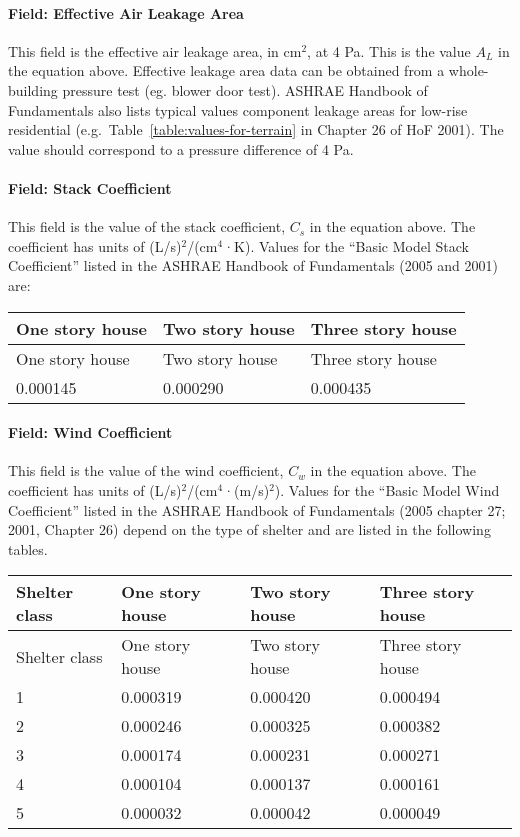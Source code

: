 \paragraph{Field: Effective Air Leakage Area}\label{field-effective-air-leakage-area}

This field is the effective air leakage area, in cm\(^{2}\), at 4 Pa. This is the value \({A_L}\) in the equation above. Effective leakage area data can be obtained from a whole-building pressure test (eg. blower door test). ASHRAE Handbook of Fundamentals also lists typical values component leakage areas for low-rise residential (e.g.~Table~\ref{table:values-for-terrain} in Chapter 26 of HoF 2001). The value should correspond to a pressure difference of 4 Pa.

\paragraph{Field: Stack Coefficient}\label{field-stack-coefficient}

This field is the value of the stack coefficient, \({C_s}\) in the equation above. The coefficient has units of (L/s)\(^{2}\)/(cm\(^{4}\)·K). Values for the ``Basic Model Stack Coefficient'' listed in the ASHRAE Handbook of Fundamentals (2005 and 2001) are:

\begin{longtable}[c]{@{}lll@{}}
\toprule
One story house & Two story house & Three story house \tabularnewline
\midrule
\endfirsthead

\toprule
One story house & Two story house & Three story house \tabularnewline
\midrule
\endhead

0.000145 & 0.000290 & 0.000435 \tabularnewline
\bottomrule
\end{longtable}

\paragraph{Field: Wind Coefficient}\label{field-wind-coefficient}

This field is the value of the wind coefficient, \({C_w}\) in the equation above. The coefficient has units of (L/s)\(^{2}\)/(cm\(^{4}\)·(m/s)\(^{2}\)). Values for the ``Basic Model Wind Coefficient'' listed in the ASHRAE Handbook of Fundamentals (2005 chapter 27; 2001, Chapter 26) depend on the type of shelter and are listed in the following tables.

\begin{longtable}[c]{@{}llll@{}}
\toprule
Shelter class & One story house & Two story house & Three story house \tabularnewline
\midrule
\endfirsthead

\toprule
Shelter class & One story house & Two story house & Three story house \tabularnewline
\midrule
\endhead

1 & 0.000319 & 0.000420 & 0.000494 \tabularnewline
2 & 0.000246 & 0.000325 & 0.000382 \tabularnewline
3 & 0.000174 & 0.000231 & 0.000271 \tabularnewline
4 & 0.000104 & 0.000137 & 0.000161 \tabularnewline
5 & 0.000032 & 0.000042 & 0.000049 \tabularnewline
\bottomrule
\end{longtable}

